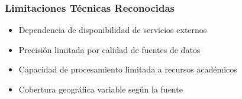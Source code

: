 \subsubsection{Limitaciones Técnicas Reconocidas}
\begin{itemize}
    \item Dependencia de disponibilidad de servicios externos
    \item Precisión limitada por calidad de fuentes de datos
    \item Capacidad de procesamiento limitada a recursos académicos
    \item Cobertura geográfica variable según la fuente
\end{itemize}

